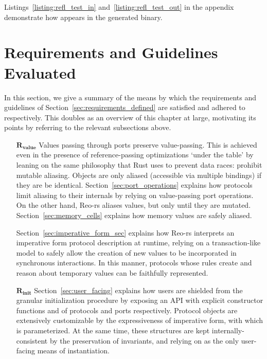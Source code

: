 Listings~\ref{listing:refl_test_in} and~\ref{listing:refl_test_out} in the appendix demonstrate how  appears in the generated binary.

\section{Requirements and Guidelines Evaluated}
\label{sec:requirements_evaluated}
In this section, we give a summary of the means by which the requirements and guidelines of Section~\ref{sec:requirements_defined} are satisfied and adhered to respectively. This doubles as an overview of this chapter at large, motivating its points by referring to the relevant subsections above.


\begin{enumerate}
	\item[$\boldsymbol{R_{value}}$] Values passing through ports preserve value-passing. This is achieved even in the presence of reference-passing optimizations `under the table' by leaning on the same philosophy that Rust uses to prevent data races: prohibit mutable aliasing. Objects are only aliased (accessible via multiple bindings) if they are be identical. Section~\ref{sec:port_operations} explains how protocols limit aliasing to their internals by relying on value-passing port operations. On the other hand, Reo-rs aliases values, but only until they are mutated. Section~\ref{sec:memory_cells} explains how memory values are safely aliased.
	
	Section~\ref{sec:imperative_form_sec} explains how Reo-rs interprets an imperative form protocol description at runtime, relying on a transaction-like model to safely allow the creation of new values to be incorporated in synchronous interactions. In this manner, protocols whose rules create and reason about temporary values can be faithfully represented.
	
	\item[$\boldsymbol{R_{init}}$] Section~\ref{sec:user_facing} explains how users are shielded from the granular initialization procedure by exposing an API with explicit constructor functions  and  of protocols and ports respectively. Protocol objects are extensively customizable by the expressiveness of imperative form, with which  is parameterized. At the same time, these structures are kept internally-consistent by the preservation of invariants, and relying on  as the only user-facing means of instantiation.
	

\end{enumerate}
